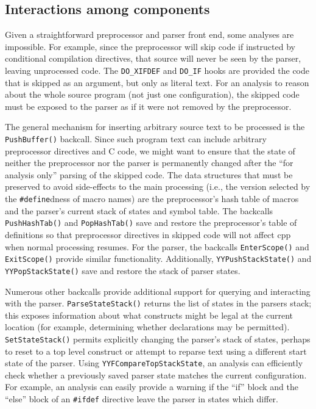 \documentclass{article}
\newcommand{\Cpp}{\mbox{\textsf{cpp}}}
\newcommand{\C}{\mbox{C}}
\newcommand{\ppd}[1]{\texttt{\##1}}
\newcommand{\ie}{i.e.,}
\begin{document}

\subsection{Interactions among components}

Given a straightforward preprocessor and parser front end, some analyses
are impossible.  For example, since the preprocessor will skip code if
instructed by conditional compilation directives, that source will never
be seen by the parser, leaving unprocessed code.  The
\texttt{DO_XIFDEF} and \texttt{DO_IF} hooks are provided the code that is
skipped as an argument, but only as literal text.  For an analysis to
reason about the whole source program (not just one configuration), the
skipped code must be exposed to the parser as if it were not removed by
the preprocessor.

The general mechanism for inserting arbitrary source text to be processed
is the \texttt{PushBuffer()} backcall.  Since such program text
can include arbitrary preprocessor directives and \C{} code, we might want to
ensure that the state of neither the preprocessor nor the parser is
permanently changed after the ``for analysis only'' parsing of the
skipped code.  The data structures that must be preserved to avoid
side-effects to the main processing (\ie{} the version selected by the
\ppd{define}dness of macro names) are the
preprocessor's hash table of macros and the parser's current stack of
states and symbol table.  The backcalls \texttt{PushHashTab()} and
\texttt{PopHashTab()} save and restore the preprocessor's table of
definitions so that preprocessor directives in skipped code will not
affect \Cpp{} when normal processing resumes.  For the parser, the
backcalls \texttt{EnterScope()} and \texttt{ExitScope()} provide similar
functionality.  Additionally, \texttt{YYPushStackState()} and
\texttt{YYPopStackState()} save and restore the stack of parser states.

Numerous other backcalls provide additional support for querying and
interacting with the parser.  \texttt{ParseStateStack()} returns the
list of states in the parsers stack; this exposes information about
what constructs might be legal at the current location (for example, determining whether
declarations may be permitted).  \texttt{SetStateStack()} permits
explicitly changing the parser's stack of states, perhaps to reset to a
top level construct or attempt to reparse text using a different start
state of the parser.  Using \texttt{YYFCompareTopStackState}, an
analysis can efficiently check whether a previously saved parser state
matches the current configuration.  For example, an analysis can easily
provide a warning if the ``if'' block and the ``else''
block of an \ppd{ifdef} directive leave the parser in states which differ.
\end{document}
